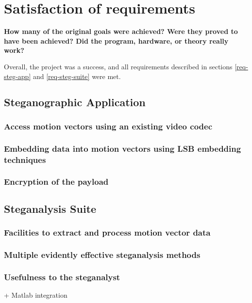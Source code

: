\documentclass[12pt,british,twoside,notitlepage,usenames,dvipsnames,hypens,final]{report}
\numberwithin{equation}{section}
\numberwithin{figure}{section}
\begin{document}
\section{Satisfaction of requirements}

\textbf{How many of the
original goals were achieved? Were they proved to have been achieved? Did the program,
hardware, or theory really work?}

Overall, the project was a success, and all requirements described in sections \ref{req-steg-app} and \ref{req-steg-suite} were met.

\subsection{Steganographic Application}

\subsubsection{Access motion vectors using an existing video codec}

\subsubsection{Embedding data into motion vectors using LSB embedding techniques}

\subsubsection{Encryption of the payload}


\subsection{Steganalysis Suite}

\subsubsection{Facilities to extract and process motion vector data}

\subsubsection{Multiple evidently effective steganalysis methods}

\subsubsection{Usefulness to the steganalyst}
+ Matlab integration
\end{document}
